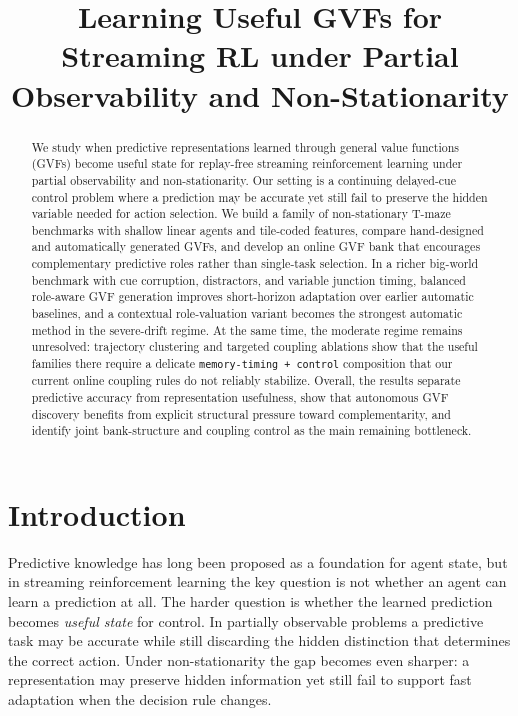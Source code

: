\documentclass[11pt]{article}
\title{Learning Useful GVFs for Streaming RL under Partial Observability and Non-Stationarity}
\author{}
\date{}
\begin{document}
\maketitle

\begin{abstract}
We study when predictive representations learned through general value functions (GVFs) become useful state for replay-free streaming reinforcement learning under partial observability and non-stationarity. Our setting is a continuing delayed-cue control problem where a prediction may be accurate yet still fail to preserve the hidden variable needed for action selection. We build a family of non-stationary T-maze benchmarks with shallow linear agents and tile-coded features, compare hand-designed and automatically generated GVFs, and develop an online GVF bank that encourages complementary predictive roles rather than single-task selection. In a richer big-world benchmark with cue corruption, distractors, and variable junction timing, balanced role-aware GVF generation improves short-horizon adaptation over earlier automatic baselines, and a contextual role-valuation variant becomes the strongest automatic method in the severe-drift regime. At the same time, the moderate regime remains unresolved: trajectory clustering and targeted coupling ablations show that the useful families there require a delicate \texttt{memory-timing + control} composition that our current online coupling rules do not reliably stabilize. Overall, the results separate predictive accuracy from representation usefulness, show that autonomous GVF discovery benefits from explicit structural pressure toward complementarity, and identify joint bank-structure and coupling control as the main remaining bottleneck.
\end{abstract}

\section{Introduction}
Predictive knowledge has long been proposed as a foundation for agent state, but in streaming reinforcement learning the key question is not whether an agent can learn a prediction at all. The harder question is whether the learned prediction becomes \emph{useful state} for control. In partially observable problems a predictive task may be accurate while still discarding the hidden distinction that determines the correct action. Under non-stationarity the gap becomes even sharper: a representation may preserve hidden information yet still fail to support fast adaptation when the decision rule changes.
\end{document}
